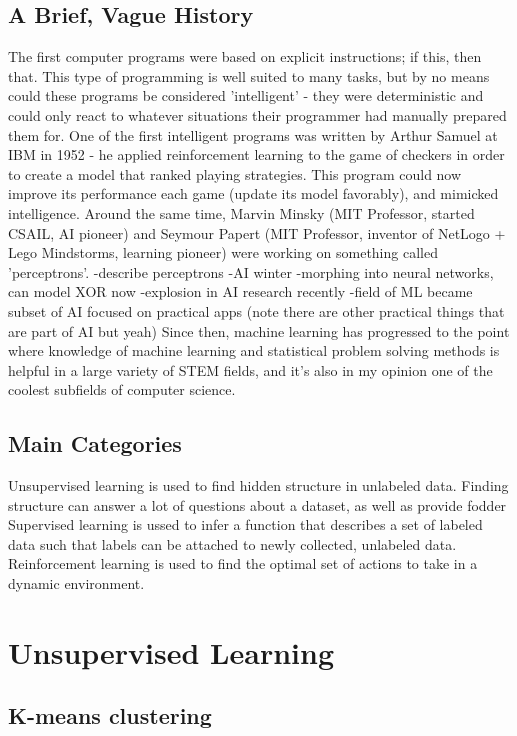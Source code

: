 \documentclass[11pt]{article}
\begin{document}
\subsection{A Brief, Vague History}
The first computer programs were based on explicit instructions; if this, then that. This type of programming is well suited to many tasks, but by no means could these programs be considered 'intelligent' - they were deterministic and could only react to whatever situations their programmer had manually prepared them for. One of the first intelligent programs was written by Arthur Samuel at IBM in 1952 - he applied reinforcement learning to the game of checkers in order to create a model that ranked playing strategies. This program could now improve its performance each game (update its model favorably), and mimicked intelligence. Around the same time, Marvin Minsky (MIT Professor, started CSAIL, AI pioneer) and Seymour Papert (MIT Professor, inventor of NetLogo + Lego Mindstorms, learning pioneer) were working on something called 'perceptrons'. 
-describe perceptrons
-AI winter
-morphing into neural networks, can model XOR now
-explosion in AI research recently
-field of ML became subset of AI focused on practical apps (note there are other practical things that are part of AI but yeah)
Since then, machine learning has progressed to the point where knowledge of machine learning and statistical problem solving methods is helpful in a large variety of STEM fields, and it's also in my opinion one of the coolest subfields of computer science.

\subsection{Main Categories}
Unsupervised learning is used to find hidden structure in unlabeled data.
Finding structure can answer a lot of questions about a dataset, as well as provide fodder 
Supervised learning is ussed to infer a function that describes a set of labeled data such that labels can be attached to newly collected, unlabeled data.
Reinforcement learning is used to find the optimal set of actions to take in a dynamic environment.

\section{Unsupervised Learning}
\subsection{K-means clustering}
\end{document}
